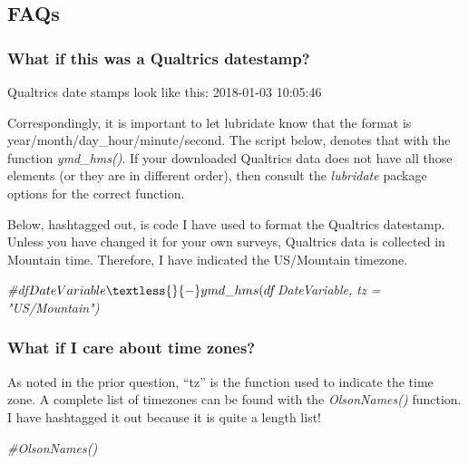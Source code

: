\documentclass[
  11pt,
]{book}
\newenvironment{Shaded}{\begin{snugshade}}{\end{snugshade}}
\newcommand{\CommentTok}[1]{\textcolor[rgb]{0.56,0.35,0.01}{\textit{#1}}}
\begin{document}
\hypertarget{faqs}{%
\subsection{FAQs}\label{faqs}}

\hypertarget{what-if-this-was-a-qualtrics-datestamp}{%
\subsubsection{What if this was a Qualtrics datestamp?}\label{what-if-this-was-a-qualtrics-datestamp}}

Qualtrics date stamps look like this: 2018-01-03 10:05:46

Correspondingly, it is important to let lubridate know that the format is year/month/day\_hour/minute/second. The script below, denotes that with the function \emph{ymd\_hms()}. If your downloaded Qualtrics data does not have all those elements (or they are in different order), then consult the \emph{lubridate} package options for the correct function.

Below, hashtagged out, is code I have used to format the Qualtrics datestamp. Unless you have changed it for your own surveys, Qualtrics data is collected in Mountain time. Therefore, I have indicated the US/Mountain timezone.

\begin{Shaded}
\begin{Highlighting}[]
\CommentTok{\#df$DateVariable \textless{}{-} ymd\_hms(df$DateVariable, tz = "US/Mountain")}
\end{Highlighting}
\end{Shaded}

\hypertarget{what-if-i-care-about-time-zones}{%
\subsubsection{What if I care about time zones?}\label{what-if-i-care-about-time-zones}}

As noted in the prior question, ``tz'' is the function used to indicate the time zone. A complete list of timezones can be found with the \emph{OlsonNames()} function. I have hashtagged it out because it is quite a length list!

\begin{Shaded}
\begin{Highlighting}[]
\CommentTok{\#OlsonNames()}
\end{Highlighting}
\end{Shaded}
\end{document}
